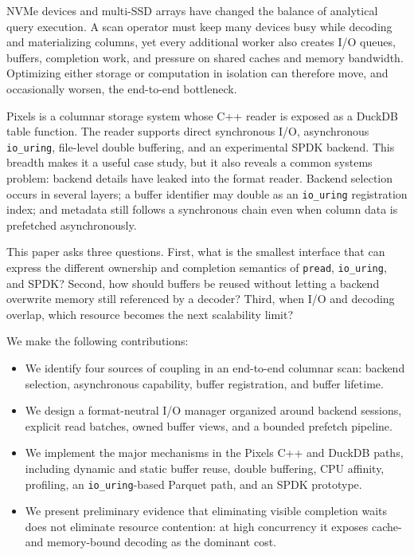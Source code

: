\documentclass[conference]{IEEEtran}
\begin{document}
NVMe devices and multi-SSD arrays have changed the balance of analytical query
execution.  A scan operator must keep many devices busy while decoding and
materializing columns, yet every additional worker also creates I/O queues,
buffers, completion work, and pressure on shared caches and memory bandwidth.
Optimizing either storage or computation in isolation can therefore move, and
occasionally worsen, the end-to-end bottleneck.

Pixels is a columnar storage system whose C++ reader is exposed as a DuckDB
table function.  The reader supports direct synchronous I/O, asynchronous
\texttt{io\_uring}, file-level double buffering, and an experimental SPDK
backend.  This breadth makes it a useful case study, but it also reveals a
common systems problem: backend details have leaked into the format reader.
Backend selection occurs in several layers; a buffer identifier may double as
an \texttt{io\_uring} registration index; and metadata still follows a
synchronous chain even when column data is prefetched asynchronously.

This paper asks three questions.  First, what is the smallest interface that
can express the different ownership and completion semantics of \texttt{pread},
\texttt{io\_uring}, and SPDK?  Second, how should buffers be reused without
letting a backend overwrite memory still referenced by a decoder?  Third, when
I/O and decoding overlap, which resource becomes the next scalability limit?

We make the following contributions:

\begin{itemize}
  \item We identify four sources of coupling in an end-to-end columnar scan:
  backend selection, asynchronous capability, buffer registration, and buffer
  lifetime.
  \item We design a format-neutral I/O manager organized around backend
  sessions, explicit read batches, owned buffer views, and a bounded prefetch
  pipeline.
  \item We implement the major mechanisms in the Pixels C++ and DuckDB paths,
  including dynamic and static buffer reuse, double buffering, CPU affinity,
  profiling, an \texttt{io\_uring}-based Parquet path, and an SPDK prototype.
  \item We present preliminary evidence that eliminating visible completion
  waits does not eliminate resource contention: at high concurrency it exposes
  cache- and memory-bound decoding as the dominant cost.
\end{itemize}
\end{document}
